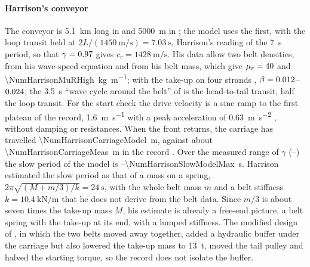 \paragraph{Harrison's conveyor} The conveyor is \qty{5.1}{\kilo\metre} long in
\citet{harrison1983} and \qty{5000}{\metre} in \citet[Fig.~2a]{harrison1985b}; the model uses
the first, with the loop transit held at $2L/(\qty{1450}{\metre\per\second})=\qty{7.03}{\second}$,
Harrison's reading of the \qty{7}{\second} period, so that $\gamma=0.97$ gives
$c_r=\qty{1428}{\metre\per\second}$. His data allow two belt densities, from his wave-speed
equation and from his belt mass, which give $\mu_r=40$ and
\qty{\NumHarrisonMuRHigh}{\kilo\gram\per\metre}; with the take-up on four strands
\citep[Fig.~2a]{harrison1985b}, $\beta=0.012$--$0.024$; the \qty{3.5}{\second} ``wave cycle around the
belt'' of \citet[p.~6]{harrison1985b} is the head-to-tail transit, half the loop transit. For the
start check the drive velocity is a sine ramp
to the first plateau of the record, \qty{1.6}{\metre\per\second} with a peak acceleration of
\qty{0.63}{\metre\per\second\squared} \citep[Fig.~2b]{harrison1985b}, without damping or
resistances. When the front returns, the carriage has travelled
\qty{\NumHarrisonCarriageModel}{\metre}, against about \qty{\NumHarrisonCarriageMeas}{\metre} in
the record \citep[Fig.~5e]{harrison1983}. Over the measured range of $\gamma$
(\NumHarrisonGammaMeasMin--\NumHarrisonGammaMeasMax) the slow period of the model is
\NumHarrisonSlowModelMin--\qty{\NumHarrisonSlowModelMax}{\second}. Harrison estimated the slow
period as that of a mass on a spring, $2\pi\sqrt{(M+m/3)/k}=\qty{24}{\second}$, with the whole
belt mass $m$ and a belt stiffness $k=\qty{10.4}{\kilo\newton\per\metre}$ that he does not derive
from the belt data. Since $m/3$ is about seven times the take-up mass $M$, his estimate is
already a free-end picture, a belt spring with the take-up at its end, with a lumped stiffness.
The modified design of \citet[p.~3]{harrison1985b}, in which the two belts moved away together,
added a hydraulic buffer under the carriage but also lowered the take-up mass to
\qty{13}{\tonne}, moved the tail pulley and halved the starting torque, so the record does not
isolate the buffer.

